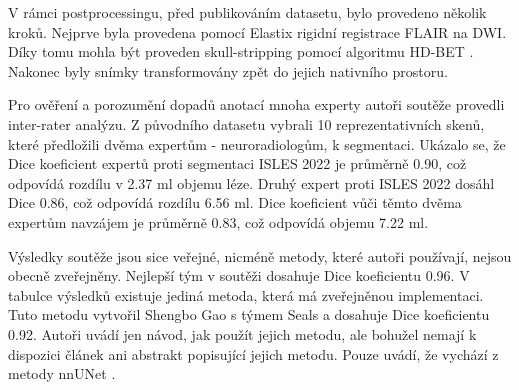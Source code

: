 \documentclass[11pt]{article}
\begin{document}
V rámci postprocessingu, před publikováním datasetu, bylo provedeno několik kroků. Nejprve byla provedena pomocí Elastix \cite{elastix} rigidní registrace FLAIR na DWI. Díky tomu mohla být proveden skull-stripping pomocí algoritmu HD-BET \cite{hd-bet}. Nakonec byly snímky transformovány zpět do jejich nativního prostoru.

Pro ověření a porozumění dopadů anotací mnoha experty autoři soutěže provedli inter-rater analýzu. Z původního datasetu vybrali 10 reprezentativních skenů, které předložili dvěma expertům - neuroradiologům, k segmentaci. Ukázalo se, že Dice koeficient expertů proti segmentaci ISLES 2022 je průměrně 0.90, což odpovídá rozdílu v 2.37 ml objemu léze. Druhý expert proti ISLES 2022 dosáhl Dice 0.86, což odpovídá rozdílu 6.56 ml. Dice koeficient vůči těmto dvěma expertům navzájem je průměrně 0.83, což odpovídá objemu 7.22 ml.

Výsledky soutěže jsou sice veřejné, nicméně metody, které autoři používají, nejsou obecně zveřejněny. Nejlepší tým v soutěži dosahuje Dice koeficientu 0.96. V tabulce výsledků existuje jediná metoda, která má zveřejněnou implementaci. Tuto metodu vytvořil Shengbo Gao s týmem Seals \cite{seals} a dosahuje Dice koeficientu 0.92. Autoři uvádí jen návod, jak použít jejich metodu, ale bohužel nemají k dispozici článek ani abstrakt popisující jejich metodu. Pouze uvádí, že vychází z metody nnUNet \cite{nnUNet}.

%
%
% 

\printbibliography
\end{document}
